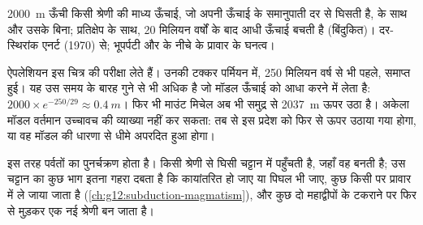 \begin{omfigure}

{\small \qty{2000}{m} ऊँची किसी श्रेणी की माध्य ऊँचाई, जो अपनी ऊँचाई के समानुपाती दर से
घिसती है,  के साथ और उसके बिना; प्रतिक्षेप के
साथ, 20 मिलियन वर्षों के बाद आधी ऊँचाई बचती है (बिंदुकित)। दर-स्थिरांक
एनर्ट (1970) से; भूपर्पटी और  के नीचे के प्रावार के
घनत्व।}
\end{omfigure}

ऐपलेशियन इस चित्र की परीक्षा लेते हैं। उनकी टक्कर पर्मियन में,
250 मिलियन वर्ष से भी पहले, समाप्त हुई। यह उस समय के बारह गुने से भी अधिक है जो
मॉडल ऊँचाई को आधा करने में लेता है: $2000 \times e^{-250/29} \approx
\qty{0.4}{m}$। फिर भी माउंट मिचेल अब भी समुद्र से \qty{2037}{m} ऊपर उठा है।
अकेला मॉडल वर्तमान उच्चावच की व्याख्या नहीं कर सकता: तब से इस प्रदेश को
फिर से ऊपर उठाया गया होगा, या वह मॉडल की धारणा से धीमे अपरदित हुआ होगा।

इस तरह पर्वतों का पुनर्चक्रण होता है। किसी श्रेणी से घिसी चट्टान  में पहुँचती है, जहाँ वह  बनती है; उस चट्टान का कुछ भाग इतना गहरा
दबता है कि कायांतरित हो जाए या पिघल भी जाए, कुछ किसी  पर प्रावार में
ले जाया जाता है (\cref{ch:g12:subduction-magmatism}), और कुछ
दो महाद्वीपों के टकराने पर फिर से मुड़कर एक नई श्रेणी बन जाता है।

